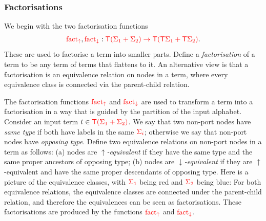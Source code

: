 \subsubsection{Factorisations}
We begin with the two factorisation functions 
\begin{align*}
    {\color{red}{\mathrm{fact_{\uparrow}}}},{\color{red}{\mathrm{fact_{\downarrow}}}}  : {\color{red}{{\color{red}{\mathsf T}}(\Sigma_1+\Sigma_2) \to {\color{red}{\mathsf T}}({\color{red}{\mathsf T}}\Sigma_1 + {\color{red}{\mathsf T}}\Sigma_2)}}.
\end{align*}
These are used to factorise a term into smaller parts. 
Define a \emph{factorisation} of a term   to be any term of terms that flattens to it.  An alternative view is that a factorisation is an equivalence relation on nodes in a term, where every equivalence class is connected via the parent-child relation.

The factorisation functions ${\color{red}{\mathrm{fact_{\uparrow}}}}$ and ${\color{red}{\mathrm{fact_{\downarrow}}}}$ are used to transform a term  into a factorisation in a way that is guided by the partition of the input alphabet.  
Consider an input term $t \in {\color{red}{{\color{red}{\mathsf T}}({\color{red}{\Sigma}}_1 + {\color{red}{\Sigma}}_2)}}$.
        We say that two non-port nodes have \emph{same type} if both have labels in the same  ${\color{red}{\Sigma_i}}$; otherwise we say that non-port nodes have \emph{opposing type}. Define  two equivalence relations on non-port nodes in a term as follows: (a) nodes are \emph{$\uparrow$-equivalent}  if they have the same type and the same proper ancestors of opposing type; (b) nodes are  \emph{$\downarrow$-equivalent}  if they  are $\uparrow$-equivalent and have the same proper descendants of opposing type.
           Here is a picture of the equivalence classes, with ${\color{red}{\Sigma_1}}$ being red and ${\color{red}{\Sigma_2}}$ being blue: 
        For both  equivalence relations, the equivalence classes are connected  under the parent-child relation, and therefore the equivalences can be seen as factorisations. These factorisations are produced by the functions ${\color{red}{\mathrm{fact_{\uparrow}}}}$ and ${\color{red}{\mathrm{fact_{\downarrow}}}}$. 
    
